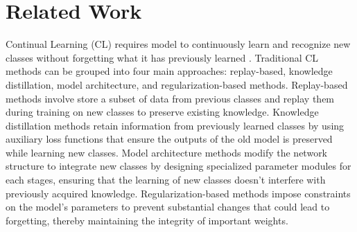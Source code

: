 \section{Related Work}

Continual Learning (CL) requires model to continuously learn and recognize new classes without forgetting what it has previously learned \cite{dong2022federated,dong2023federated,gao2022r,goswami2024fecam,wang2022beef,zhao2021mgsvf}. Traditional CL methods can be grouped into four main approaches: replay-based, knowledge distillation, model architecture, and regularization-based methods. Replay-based methods \cite{liu2021rmm,luo2023class,wu2019large,buzzega2020dark,wang2022memory,wang2021triple,rebuffi2017icarl} involve store a subset of data from previous classes and replay them during training on new classes to preserve existing knowledge. Knowledge distillation methods \cite{dhar2019learning,douillard2020podnet,li2017learning,simon2021learning,tao2020topology} retain information from previously learned classes by using auxiliary loss functions that ensure the outputs of the old model is preserved while learning new classes. Model architecture methods \cite{shi2022mimicking,zhao2020maintaining,hu2023dense,wang2023incorporating,yang2022continual} modify the network structure to integrate new classes by designing specialized parameter modules for each stages, ensuring that the learning of new classes doesn't interfere with previously acquired knowledge. Regularization-based methods \cite{zhou2023hierarchical,aljundi2018memory,zenke2017continual,xiang2022coarse,dhar2019learning,li2017learning} impose constraints on the model’s parameters to prevent substantial changes that could lead to forgetting, thereby maintaining the integrity of important weights.


